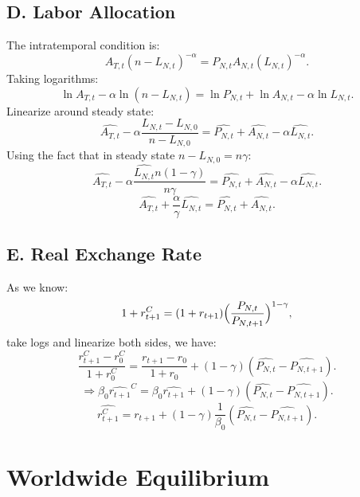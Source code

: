 \documentclass[a4paper,12pt]{article} %
\theoremstyle{nonitalic}
\begin{document}
\subsection*{D. Labor Allocation}
The intratemporal condition is:
\[
A_{T,t}(n-L_{N,t})^{-\alpha} = P_{N,t} A_{N,t}(L_{N,t})^{-\alpha}.
\]
Taking logarithms:
\[
\ln A_{T,t} - \alpha \ln (n-L_{N,t}) = \ln P_{N,t} + \ln A_{N,t} - \alpha \ln L_{N,t}.
\]
Linearize around steady state:
\[
\widehat{A_{T,t}} - \alpha \frac{L_{N,t} - L_{N,0}}{n-L_{N,0}} =  \widehat{P_{N,t}} +  \widehat{A_{N,t}} - \alpha  \widehat{L_{N,t}}.
\]
Using the fact that in steady state $n-L_{N,0}=n\gamma$:
\[
\widehat{A_{T,t}} - \alpha \frac{ \widehat{L_{N,t}} n(1-\gamma)}{n \gamma} =  \widehat{P_{N,t}} +  \widehat{A_{N,t}} - \alpha  \widehat{L_{N,t}}.
\]
\[
\boxed{\widehat{A_{T,t}} + \frac{\alpha}{\gamma}  \widehat{L_{N,t}} =  \widehat{P_{N,t}} +  \widehat{A_{N,t}}. \tag{7g}}
\]

\subsection*{E. Real Exchange Rate}
As we know:
\[
1+r_{t+1}^{C} = (1+r_{t+1}) \Bigl(\frac{P_{N,t}}{P_{N,t+1}}\Bigr)^{1-\gamma},
\]
take logs and linearize both sides, we have:
\[
\frac{r_{t+1}^C - r_0^C }{1+r_0^C} = \frac{r_{t+1} - r_0}{1+r_0} + (1-\gamma)( \widehat{P_{N,t}} -  \widehat{P_{N,t+1}}).
\]
\[
\Rightarrow \beta_0  \widehat{r_{t+1}}^C = \beta_0  \widehat{r_{t+1}} + (1-\gamma)( \widehat{P_{N,t}} -  \widehat{P_{N,t+1}}).
\]
\[
\boxed{ \widehat{r_{t+1}^C} =  \widehat{r_{t+1}} + (1-\gamma) \frac{1}{\beta_0} ( \widehat{P_{N,t}} -  \widehat{P_{N,t+1}}). \tag{7i}}
\]


\section{Worldwide Equilibrium}
\end{document}
